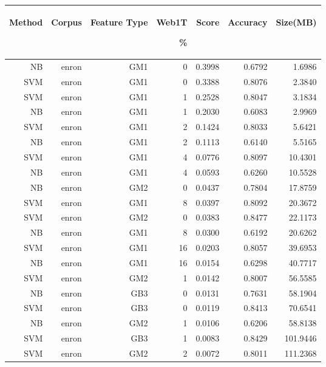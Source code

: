 \begin{table}[htbp!]
	\begin{center}
		\begin{tabular}{ | r | r | r | r | r | r | r | }
			\hline
			\begin{sideways}Method\end{sideways} & \begin{sideways}Corpus\end{sideways} & \begin{sideways}Feature Type\end{sideways} & \begin{sideways}Web1T\end{sideways} \% & \begin{sideways}Score\end{sideways} & \begin{sideways}Accuracy\end{sideways} & \begin{sideways}Size(MB)\end{sideways}\\ \hline 

		NB & enron & GM1 & 0 & 0.3998 & 0.6792 & 1.6986\\ \hline 
		SVM & enron & GM1 & 0 & 0.3388 & 0.8076 & 2.3840\\ \hline 
		SVM & enron & GM1 & 1 & 0.2528 & 0.8047 & 3.1834\\ \hline 
		NB & enron & GM1 & 1 & 0.2030 & 0.6083 & 2.9969\\ \hline 
		SVM & enron & GM1 & 2 & 0.1424 & 0.8033 & 5.6421\\ \hline 
		NB & enron & GM1 & 2 & 0.1113 & 0.6140 & 5.5165\\ \hline 
		SVM & enron & GM1 & 4 & 0.0776 & 0.8097 & 10.4301\\ \hline 
		NB & enron & GM1 & 4 & 0.0593 & 0.6260 & 10.5528\\ \hline 
		NB & enron & GM2 & 0 & 0.0437 & 0.7804 & 17.8759\\ \hline 
		SVM & enron & GM1 & 8 & 0.0397 & 0.8092 & 20.3672\\ \hline 
		SVM & enron & GM2 & 0 & 0.0383 & 0.8477 & 22.1173\\ \hline 
		NB & enron & GM1 & 8 & 0.0300 & 0.6192 & 20.6262\\ \hline 
		SVM & enron & GM1 & 16 & 0.0203 & 0.8057 & 39.6953\\ \hline 
		NB & enron & GM1 & 16 & 0.0154 & 0.6298 & 40.7717\\ \hline 
		SVM & enron & GM2 & 1 & 0.0142 & 0.8007 & 56.5585\\ \hline 
		NB & enron & GB3 & 0 & 0.0131 & 0.7631 & 58.1904\\ \hline 
		SVM & enron & GB3 & 0 & 0.0119 & 0.8413 & 70.6541\\ \hline 
		NB & enron & GM2 & 1 & 0.0106 & 0.6206 & 58.8138\\ \hline 
		SVM & enron & GB3 & 1 & 0.0083 & 0.8429 & 101.9446\\ \hline 
		SVM & enron & GM2 & 2 & 0.0072 & 0.8011 & 111.2368\\ \hline 



\end{tabular}
\end{center}
\end{table}
